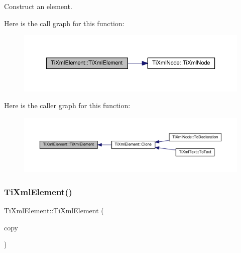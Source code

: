 Construct an element. 

Here is the call graph for this function\+:\nopagebreak
\begin{figure}[H]
\begin{center}
\leavevmode
\includegraphics[width=350pt]{class_ti_xml_element_a01bc3ab372d35da08efcbbe65ad90c60_cgraph}
\end{center}
\end{figure}
Here is the caller graph for this function\+:\nopagebreak
\begin{figure}[H]
\begin{center}
\leavevmode
\includegraphics[width=350pt]{class_ti_xml_element_a01bc3ab372d35da08efcbbe65ad90c60_icgraph}
\end{center}
\end{figure}
\mbox{\label{class_ti_xml_element_a1ca4465f3c2eac6a60e641cd7f1d9f7e}} 
\subsubsection{\texorpdfstring{Ti\+Xml\+Element()}{TiXmlElement()}\hspace{0.1cm}{\footnotesize\ttfamily [2/2]}}
{\footnotesize\ttfamily Ti\+Xml\+Element\+::\+Ti\+Xml\+Element (\begin{DoxyParamCaption}\item[{const \hyperlink{class_ti_xml_element}{Ti\+Xml\+Element} \&}]{copy }\end{DoxyParamCaption})}


